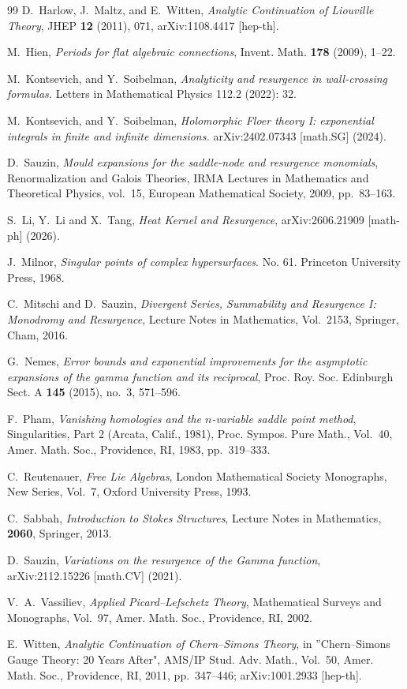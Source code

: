 \documentclass[11pt]{amsart}
\theoremstyle{plain}
\begin{document}
\begin{thebibliography}{99}
D.~Harlow, J.~Maltz, and E.~Witten,
\textit{Analytic Continuation of Liouville Theory},
 JHEP {\bf 12} (2011), 071,
 arXiv:1108.4417 [hep-th].


M.~Hien,
 \textit{Periods for flat algebraic connections},
 Invent. Math. \textbf{178} (2009), 1--22.

M.~Kontsevich, and Y.~Soibelman, \textit{Analyticity and resurgence in wall-crossing formulas.} Letters in Mathematical Physics 112.2 (2022): 32.

M.~Kontsevich, and Y.~Soibelman, \textit{Holomorphic Floer theory I: exponential integrals in finite and infinite dimensions.} arXiv:2402.07343 [math.SG] (2024).

D.~Sauzin,
\textit{Mould expansions for the saddle-node and resurgence monomials},
Renormalization and Galois Theories,
IRMA Lectures in Mathematics and Theoretical Physics, vol.~15,
European Mathematical Society, 2009, pp.~83--163.

S.~Li, Y.~Li and X.~Tang,
\textit{Heat Kernel and Resurgence}, arXiv:2606.21909  [math-ph] (2026).

J.~Milnor, \textit{Singular points of complex hypersurfaces}. No. 61. Princeton University Press, 1968.

C.~Mitschi and D.~Sauzin,
\textit{Divergent Series, Summability and Resurgence I: Monodromy and Resurgence},
 Lecture Notes in Mathematics, Vol.~2153, Springer, Cham, 2016.

G.~Nemes,
\textit{Error bounds and exponential improvements for the asymptotic expansions of the gamma function and its reciprocal},
Proc. Roy. Soc. Edinburgh Sect. A \textbf{145} (2015), no.~3, 571--596.

F.~Pham,
\textit{Vanishing homologies and the $n$-variable saddle point method},
 {Singularities, Part 2 (Arcata, Calif., 1981)},
 Proc. Sympos. Pure Math., Vol.~40, Amer. Math. Soc., Providence, RI, 1983, pp.~319--333.


C.~Reutenauer,
 \textit{Free Lie Algebras},
 London Mathematical Society Monographs, New Series, Vol.~7, Oxford University Press, 1993.


C.~Sabbah,
\textit{Introduction to Stokes Structures},
 Lecture Notes in Mathematics,
\textbf{2060}, Springer, 2013.

D.~Sauzin,
\textit{Variations on the resurgence of the Gamma function}, 
arXiv:2112.15226 [math.CV] (2021).

V.~A.~Vassiliev,
\textit{Applied Picard--Lefschetz Theory},
 Mathematical Surveys and Monographs, Vol.~97, Amer. Math. Soc., Providence, RI, 2002.

E.~Witten,
\textit{Analytic Continuation of Chern--Simons Theory},
in ''Chern--Simons Gauge Theory: 20 Years After",
 AMS/IP Stud. Adv. Math., Vol.~50, Amer. Math. Soc., Providence, RI, 2011, pp.~347--446;
 arXiv:1001.2933 [hep-th].

\end{thebibliography}
\end{document}

